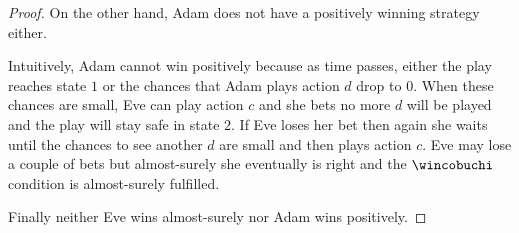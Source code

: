 \begin{proof}
On the other hand, Adam does not have a positively winning
strategy either.
{
Intuitively, Adam cannot win positively because as time passes, either the play reaches state $1$ or the chances that Adam plays action $d$ drop to $0$. When these chances are small, 
Eve can play action $c$ and she bets no more $d$ will be played and the play will stay safe in state $2$. If Eve loses her bet
then again she waits until the chances to see another $d$ are small and then plays action $c$. Eve may lose a couple of bets but almost-surely she eventually is right and the $\wincobuchi$ condition is almost-surely fulfilled.

Finally neither Eve wins almost-surely nor Adam wins positively.
}
\end{proof}



